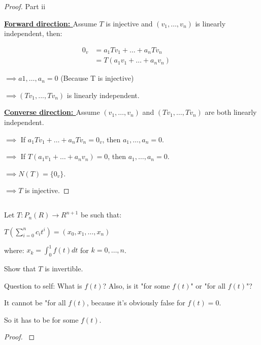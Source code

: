 \documentclass{article}
\newenvironment{customthm}[1]
  {\renewcommand\theinnercustomthm{#1}\innercustomthm}
  {\endinnercustomthm}
\begin{document}
\begin{proof}{Part ii}
  $ $

  \textbf{\underline{Forward direction: }} Assume $T$ is injective and $(v_1,\ldots, v_n)$ is linearly independent, then:

  \begin{align*}
    0_v &= a_1Tv_1 + \ldots + a_n Tv_n &&\\
    &= T(a_1v_1 + \ldots + a_nv_n)
  \end{align*}

  \noindent
  $\implies a1,\ldots,a_n = 0$ \qquad (Because T is injective)

  \noindent
  $\implies (Tv_1,...,Tv_n)$ is linearly independent.

  \textbf{\underline{Converse direction: }} Assume $(v_1,\ldots,v_n)$ and $(Tv_1,\ldots,Tv_n)$ are both linearly independent.

  \noindent
  $\implies$ If $a_1Tv_1 + \ldots + a_nTv_n = 0_v$, then $a_1,\ldots,a_n = 0$.

  \noindent
  $\implies$ If $T(a_1v_1+\ldots+a_nv_n) = 0$, then $a_1,\ldots,a_n = 0$.

  \noindent
  $\implies N(T) = \{ 0_v \}$.

  \noindent
  $\implies T$ is injective.

\end{proof}
\newpage

\begin{customthm}{7}[2023.S(2.A)]
  $ $

  Let $T: P_n(R) \rightarrow R^{n+1}$ be such that:

  \qquad $T(\sum_{i=0}^{n} c_it^i) = (x_0, x_1,\ldots, x_n)$

  where: $x_k = \int_{0}^{1}f(t)dt$ \qquad for $k = 0,\ldots,n$.
  \newline
  
  Show that $T$ is invertible.
  \newline

  Question to self: What is $f(t)$? Also, is it "for some $f(t)$" or "for all $f(t)$"?

  It cannot be "for all $f(t)$, because it's obviously false for $f(t)=0$.

  So it has to be for some $f(t)$.

\end{customthm}

\begin{proof}
  $ $
  
  

\end{proof}
\newpage
\end{document}
